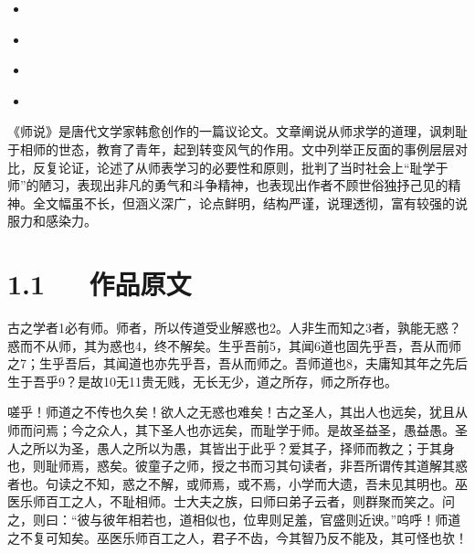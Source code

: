 \documentclass[letterpaper,12pt,english]{sphinxmanual}
\begin{document}
\begin{sphinxShadowBox}
\begin{itemize}
\begin{itemize}
\begin{itemize}
\item {} 
\label{\detokenize{p01_u6563_u6587/_u97e9_u6108-_u5e08_u8bf4:id22}}{\hyperref[\detokenize{p01_u6563_u6587/_u97e9_u6108-_u5e08_u8bf4:id10}]{}}

\item {} 
\label{\detokenize{p01_u6563_u6587/_u97e9_u6108-_u5e08_u8bf4:id23}}{\hyperref[\detokenize{p01_u6563_u6587/_u97e9_u6108-_u5e08_u8bf4:id11}]{}}

\item {} 
\label{\detokenize{p01_u6563_u6587/_u97e9_u6108-_u5e08_u8bf4:id24}}{\hyperref[\detokenize{p01_u6563_u6587/_u97e9_u6108-_u5e08_u8bf4:id12}]{}}

\item {} 
\label{\detokenize{p01_u6563_u6587/_u97e9_u6108-_u5e08_u8bf4:id25}}{\hyperref[\detokenize{p01_u6563_u6587/_u97e9_u6108-_u5e08_u8bf4:id13}]{}}

\end{itemize}

\end{itemize}

\end{itemize}
\end{sphinxShadowBox}

《师说》是唐代文学家韩愈创作的一篇议论文。文章阐说从师求学的道理，讽刺耻于相师的世态，教育了青年，起到转变风气的作用。文中列举正反面的事例层层对比，反复论证，论述了从师表学习的必要性和原则，批判了当时社会上“耻学于师”的陋习，表现出非凡的勇气和斗争精神，也表现出作者不顾世俗独抒己见的精神。全文幅虽不长，但涵义深广，论点鲜明，结构严谨，说理透彻，富有较强的说服力和感染力。


\section{1.1   作品原文}
\label{\detokenize{p01_u6563_u6587/_u97e9_u6108-_u5e08_u8bf4:id3}}
古之学者1必有师。师者，所以传道受业解惑也2。人非生而知之3者，孰能无惑？惑而不从师，其为惑也4，终不解矣。生乎吾前5，其闻6道也固先乎吾，吾从而师之7；生乎吾后，其闻道也亦先乎吾，吾从而师之。吾师道也8，夫庸知其年之先后生于吾乎9？是故10无11贵无贱，无长无少，道之所存，师之所存也。

嗟乎！师道之不传也久矣！欲人之无惑也难矣！古之圣人，其出人也远矣，犹且从师而问焉；今之众人，其下圣人也亦远矣，而耻学于师。是故圣益圣，愚益愚。圣人之所以为圣，愚人之所以为愚，其皆出于此乎？爱其子，择师而教之；于其身也，则耻师焉，惑矣。彼童子之师，授之书而习其句读者，非吾所谓传其道解其惑者也。句读之不知，惑之不解，或师焉，或不焉，小学而大遗，吾未见其明也。巫医乐师百工之人，不耻相师。士大夫之族，曰师曰弟子云者，则群聚而笑之。问之，则曰：“彼与彼年相若也，道相似也，位卑则足羞，官盛则近谀。”呜呼！师道之不复可知矣。巫医乐师百工之人，君子不齿，今其智乃反不能及，其可怪也欤！
\end{document}
